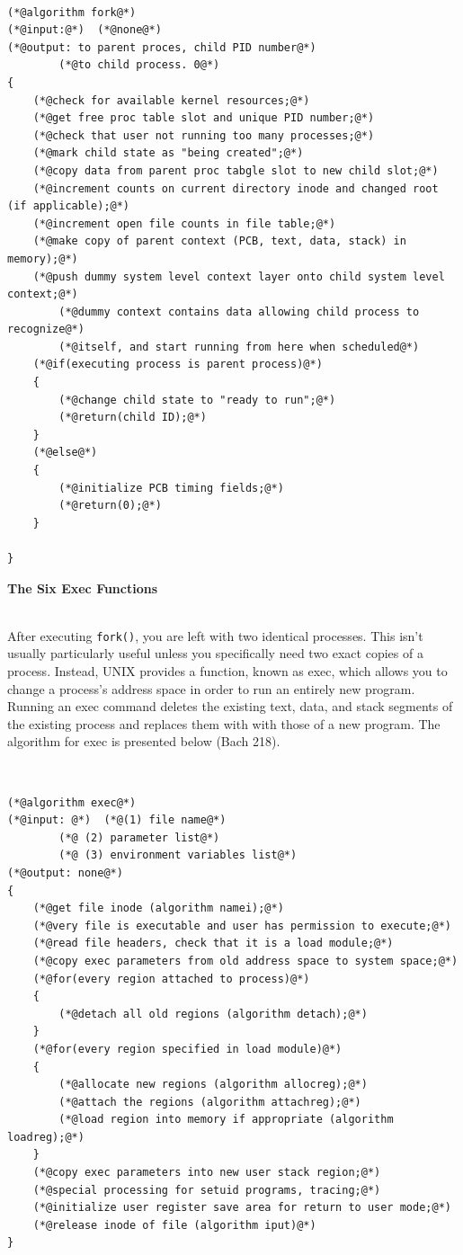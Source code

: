 \documentclass[12pt]{extarticle}
\newenvironment{myindentpar}[1]%
 {\begin{list}{}%
         {\setlength{\leftmargin}{#1}}%
         \item[]%
 }
 {\end{list}}
\newcommand{\code}[1]{\colorbox{codegray}{\texttt{#1}}}
\begin{document}
\begin{myindentpar}{5mm}
    
\ \\
\begin{lstlisting}[frame=single]
(*@algorithm fork@*)
(*@input:@*)  (*@none@*)
(*@output: to parent proces, child PID number@*)
        (*@to child process. 0@*)
{
    (*@check for available kernel resources;@*)
    (*@get free proc table slot and unique PID number;@*)
    (*@check that user not running too many processes;@*)
    (*@mark child state as "being created";@*)
    (*@copy data from parent proc tabgle slot to new child slot;@*)
    (*@increment counts on current directory inode and changed root (if applicable);@*)
    (*@increment open file counts in file table;@*)
    (*@make copy of parent context (PCB, text, data, stack) in memory);@*)
    (*@push dummy system level context layer onto child system level context;@*)
        (*@dummy context contains data allowing child process to recognize@*)
        (*@itself, and start running from here when scheduled@*)
    (*@if(executing process is parent process)@*)
    {
        (*@change child state to "ready to run";@*)
        (*@return(child ID);@*)
    }
    (*@else@*)
    {
        (*@initialize PCB timing fields;@*)
        (*@return(0);@*)
    }

}
\end{lstlisting}
    
    \newpage
    \noindent
    \textbf{The Six Exec Functions}
    
    \ \\
    After executing \code{fork()}, you are left with two identical processes.  This isn't usually particularly useful unless you specifically need two exact copies of a process.  Instead, UNIX provides a function, known as exec, which allows you to change a process's address space in order to run an entirely new program.  Running an exec command deletes the existing text, data, and stack segments of the existing process and replaces them with with those of a new program.  The algorithm for exec is presented below (Bach 218).  
    
\ \\
\begin{lstlisting}[frame=single]
(*@algorithm exec@*)
(*@input: @*)  (*@(1) file name@*)
        (*@ (2) parameter list@*)
        (*@ (3) environment variables list@*)
(*@output: none@*)
{
    (*@get file inode (algorithm namei);@*)
    (*@very file is executable and user has permission to execute;@*)
    (*@read file headers, check that it is a load module;@*)
    (*@copy exec parameters from old address space to system space;@*)
    (*@for(every region attached to process)@*)
    {
        (*@detach all old regions (algorithm detach);@*)
    }
    (*@for(every region specified in load module)@*)
    {
        (*@allocate new regions (algorithm allocreg);@*)
        (*@attach the regions (algorithm attachreg);@*)
        (*@load region into memory if appropriate (algorithm loadreg);@*)
    }
    (*@copy exec parameters into new user stack region;@*)
    (*@special processing for setuid programs, tracing;@*)
    (*@initialize user register save area for return to user mode;@*)
    (*@release inode of file (algorithm iput)@*)
}
\end{lstlisting}


\end{myindentpar}
\end{document}
